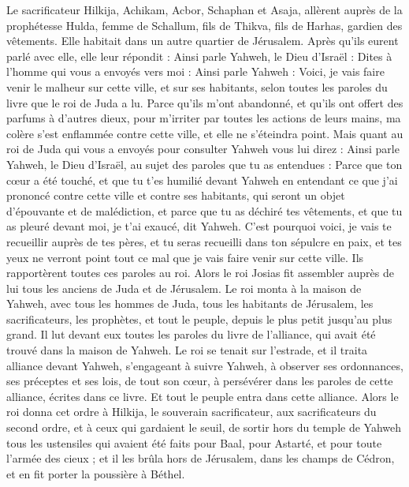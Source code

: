 \begin{multicols}{2}
Le sacrificateur Hilkija, Achikam, Acbor, Schaphan et Asaja, allèrent auprès de la prophétesse Hulda, femme de Schallum, fils de Thikva, fils de Harhas, gardien des vêtements. Elle habitait dans un autre quartier de Jérusalem.
Après qu’ils eurent parlé avec elle, elle leur répondit : Ainsi parle Yahweh, le Dieu d’Israël : Dites à l’homme qui vous a envoyés vers moi :
Ainsi parle Yahweh : Voici, je vais faire venir le malheur sur cette ville, et sur ses habitants, selon toutes les paroles du livre que le roi de Juda a lu.
Parce qu’ils m’ont abandonné, et qu’ils ont offert des parfums à d’autres dieux, pour m’irriter par toutes les actions de leurs mains, ma colère s’est enflammée contre cette ville, et elle ne s’éteindra point.
Mais quant au roi de Juda qui vous a envoyés pour consulter Yahweh vous lui direz : Ainsi parle Yahweh, le Dieu d’Israël, au sujet des paroles que tu as entendues :
Parce que ton cœur a été touché, et que tu t’es humilié devant Yahweh en entendant ce que j’ai prononcé contre cette ville et contre ses habitants, qui seront un objet d’épouvante et de malédiction, et parce que tu as déchiré tes vêtements, et que tu as pleuré devant moi, je t’ai exaucé, dit Yahweh.
C’est pourquoi voici, je vais te recueillir auprès de tes pères, et tu seras recueilli dans ton sépulcre en paix, et tes yeux ne verront point tout ce mal que je vais faire venir sur cette ville. Ils rapportèrent toutes ces paroles au roi.
\VerseOne{}Alors le roi Josias fit assembler auprès de lui tous les anciens de Juda et de Jérusalem.
Le roi monta à la maison de Yahweh, avec tous les hommes de Juda, tous les habitants de Jérusalem, les sacrificateurs, les prophètes, et tout le peuple, depuis le plus petit jusqu’au plus grand. Il lut devant eux toutes les paroles du livre de l’alliance, qui avait été trouvé dans la maison de Yahweh.
Le roi se tenait sur l’estrade, et il traita alliance devant Yahweh, s’engageant à suivre Yahweh, à observer ses ordonnances, ses préceptes et ses lois, de tout son cœur, à persévérer dans les paroles de cette alliance, écrites dans ce livre. Et tout le peuple entra dans cette alliance.
Alors le roi donna cet ordre à Hilkija, le souverain sacrificateur, aux sacrificateurs du second ordre, et à ceux qui gardaient le seuil, de sortir hors du temple de Yahweh tous les ustensiles qui avaient été faits pour Baal\FTNT{}, pour Astarté\FTNT{}, et pour toute l’armée des cieux ; et il les brûla hors de Jérusalem, dans les champs de Cédron, et en fit porter la poussière à Béthel.

\end{multicols}
